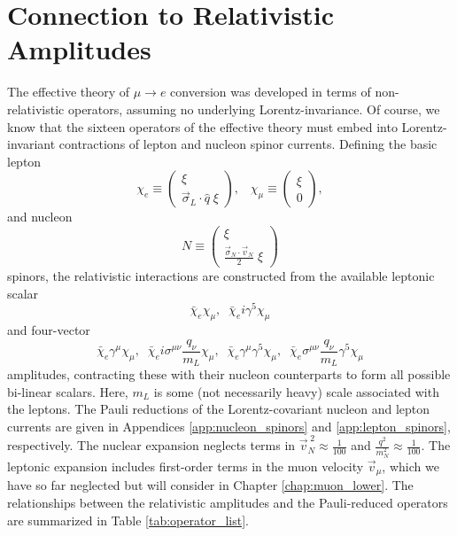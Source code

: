 \documentclass{book}[letterpaper,12pt]
\begin{document}
\section{Connection to Relativistic Amplitudes}
\label{sec:relativistic}
The effective theory of $\mu\rightarrow e$ conversion was developed in terms of non-relativistic operators, assuming no underlying Lorentz-invariance. Of course, we know that the sixteen operators of the effective theory must embed into Lorentz-invariant contractions of lepton and nucleon spinor currents. Defining the basic lepton
\begin{equation}
\chi_e\equiv \left(\begin{array}{c}
\xi\\
\vec{\sigma}_L\cdot\hat{q}\;\xi
\end{array}\right),\;\;\;\chi_{\mu}\equiv\left(\begin{array}{c}
\xi\\
0
\end{array}\right),
\end{equation}
and nucleon
\begin{equation}
N\equiv\left(\begin{array}{c}
\xi\\
\frac{\vec{\sigma}_N\cdot\vec{v}_N}{2}\;\xi
\end{array}\right)
\end{equation}
spinors, the relativistic interactions are constructed from the available leptonic scalar
\begin{equation}
\bar{\chi}_e\chi_{\mu},\;\;\bar{\chi}_ei\gamma^5\chi_{\mu}
\end{equation}
and four-vector
\begin{equation}
\bar{\chi}_e\gamma^{\mu}\chi_{\mu},\;\;\bar{\chi}_ei\sigma^{\mu\nu}\frac{q_{\nu}}{m_L}\chi_{\mu},\;\;\bar{\chi}_e\gamma^{\mu}\gamma^5\chi_{\mu},\;\;\bar{\chi}_e\sigma^{\mu\nu}\frac{q_{\nu}}{m_L}\gamma^5\chi_{\mu}
\end{equation}
amplitudes, contracting these with their nucleon counterparts to form all possible bi-linear scalars. Here, $m_L$ is some (not necessarily heavy) scale associated with the leptons. The Pauli reductions of the Lorentz-covariant nucleon and lepton currents are given in Appendices \ref{app:nucleon_spinors} and \ref{app:lepton_spinors}, respectively. The nuclear expansion neglects terms in $\vec{v}_N^{\;2}\approx\frac{1}{100}$ and $\frac{q^2}{m_N^2}\approx\frac{1}{100}$. The leptonic expansion includes first-order terms in the muon velocity $\vec{v}_{\mu}$, which we have so far neglected but will consider in Chapter \ref{chap:muon_lower}. The relationships between the relativistic amplitudes and the Pauli-reduced operators are summarized in Table \ref{tab:operator_list}.
\end{document}
